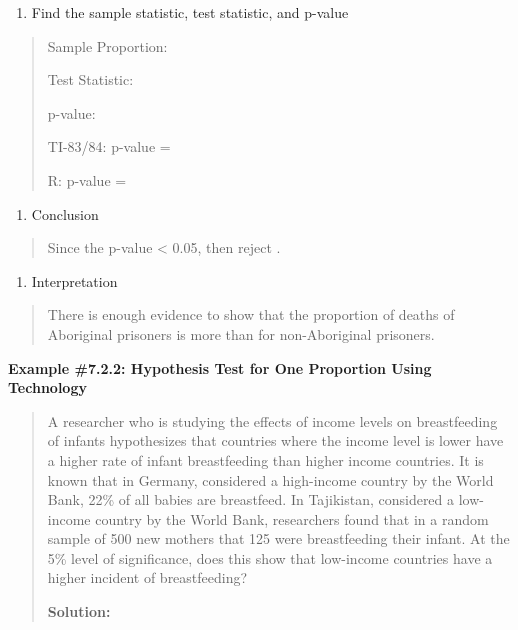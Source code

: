 \documentclass[]{book}
\providecommand{\tightlist}{%
  \setlength{\itemsep}{0pt}\setlength{\parskip}{0pt}}
\begin{document}
\begin{enumerate}
\def\labelenumi{\arabic{enumi}.}
\setcounter{enumi}{3}
\tightlist
\item
  Find the sample statistic, test statistic, and p-value
\end{enumerate}

\begin{quote}
Sample Proportion:

Test Statistic:

p-value:

TI-83/84: p-value =

R: p-value =
\end{quote}

\begin{enumerate}
\def\labelenumi{\arabic{enumi}.}
\setcounter{enumi}{4}
\tightlist
\item
  Conclusion
\end{enumerate}

\begin{quote}
Since the p-value \textless{} 0.05, then reject .
\end{quote}

\begin{enumerate}
\def\labelenumi{\arabic{enumi}.}
\setcounter{enumi}{5}
\tightlist
\item
  Interpretation
\end{enumerate}

\begin{quote}
There is enough evidence to show that the proportion of deaths of
Aboriginal prisoners is more than for non-Aboriginal prisoners.
\end{quote}

\textbf{Example \#7.2.2: Hypothesis Test for One Proportion Using Technology}

\begin{quote}
A researcher who is studying the effects of income levels on
breastfeeding of infants hypothesizes that countries where the income
level is lower have a higher rate of infant breastfeeding than higher
income countries. It is known that in Germany, considered a
high-income country by the World Bank, 22\% of all babies are
breastfeed. In Tajikistan, considered a low-income country by the
World Bank, researchers found that in a random sample of 500 new
mothers that 125 were breastfeeding their infant. At the 5\% level of
significance, does this show that low-income countries have a higher
incident of breastfeeding?

\textbf{Solution:}
\end{quote}
\end{document}
